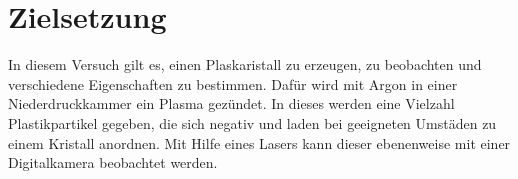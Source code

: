 \section{Zielsetzung}
In diesem Versuch gilt es, einen Plaskaristall zu erzeugen, zu beobachten und verschiedene Eigenschaften zu bestimmen. Dafür wird mit Argon in einer Niederdruckkammer ein Plasma gezündet. In dieses werden eine Vielzahl Plastikpartikel gegeben, die sich negativ und laden bei geeigneten Umstäden zu einem Kristall anordnen. Mit Hilfe eines Lasers kann dieser ebenenweise mit einer Digitalkamera beobachtet werden.